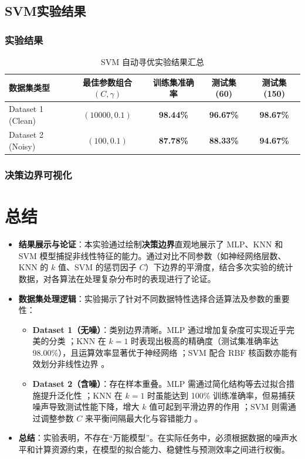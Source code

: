 \subsection{SVM实验结果}

\subsubsection{实验结果}
\begin{table}[htbp]
	\centering
	\caption{SVM 自动寻优实验结果汇总}
	\label{tab:svm_results}
	\begin{tabular}{lcccc}
		\toprule
		数据集类型 & 最佳参数组合 $(C, \gamma)$ & 训练集准确率 & 测试集 (60) & 测试集 (150) \\
		\midrule
		Dataset 1 (Clean) & $(10000, 0.1)$ & \textbf{98.44\%} & \textbf{96.67\%} & \textbf{98.67\%} \\
		Dataset 2 (Noisy) & $(100, 0.1)$   & \textbf{87.78\%} & \textbf{88.33\%} & \textbf{94.67\%} \\
		\bottomrule
	\end{tabular}
\end{table}

\subsubsection{决策边界可视化}


\section{总结}

\begin{itemize}
	\item \textbf{结果展示与论证}：本实验通过绘制\textbf{决策边界}直观地展示了 MLP、KNN 和 SVM 模型捕捉非线性特征的能力。通过对比不同参数（如神经网络层数、KNN 的 $k$ 值、SVM 的惩罚因子 $C$）下边界的平滑度，结合多次实验的统计数据，对各算法在处理复杂分布时的表现进行了论证。
	\item \textbf{数据集处理逻辑}：实验揭示了针对不同数据特性选择合适算法及参数的重要性：
	\begin{itemize}
		\item \textbf{Dataset 1（无噪）}：类别边界清晰。MLP 通过增加复杂度可实现近乎完美的分类 ；KNN 在 $k=1$ 时表现出极高的精确度（测试集准确率达 98.00\%），且运算效率显著优于神经网络 ；SVM 配合 RBF 核函数亦能有效划分非线性边界 。
		\item \textbf{Dataset 2（含噪）}：存在样本重叠。MLP 需通过简化结构等去过拟合措施提升泛化性 ；KNN 在 $k=1$ 时虽能达到 100\% 训练准确率，但易捕获噪声导致测试性能下降，增大 $k$ 值可起到平滑边界的作用 ；SVM 则需通过调整参数 $C$ 来平衡间隔最大化与容错能力 。
	\end{itemize}
	\item \textbf{总结}：实验表明，不存在“万能模型”。在实际任务中，必须根据数据的噪声水平和计算资源约束，在模型的拟合能力、稳健性与预测效率之间进行权衡。
\end{itemize}  

